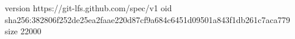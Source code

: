 version https://git-lfs.github.com/spec/v1
oid sha256:382806f252de25ea2faae220d87cf9a684c6451d09501a843f1db261c7aca779
size 22000
